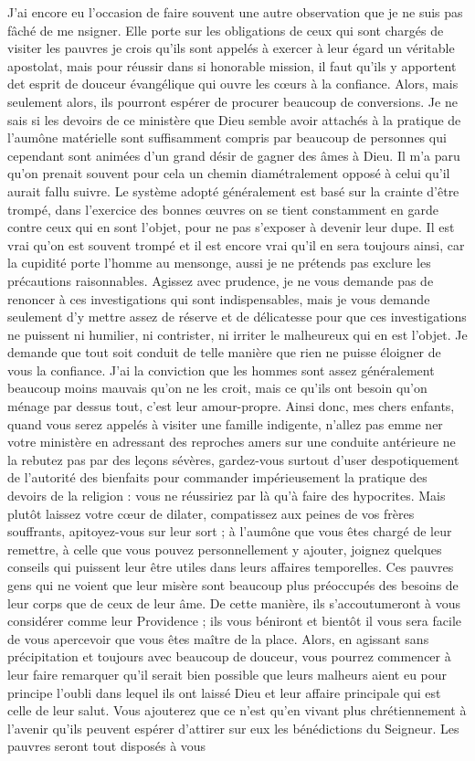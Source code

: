 \documentclass[11pt,a4paper]{report}
\begin{document}
J'ai encore eu l'occasion de faire souvent une autre observation que je ne suis pas fâché de me nsigner. Elle porte sur les obligations de ceux qui sont chargés de visiter les pauvres je crois qu'ils sont appelés à exercer à leur égard un véritable apostolat, mais pour réussir dans si honorable mission, il faut qu'ils y apportent det esprit de douceur évangélique qui ouvre les cœurs à la confiance. Alors, mais seulement alors, ils pourront espérer de procurer beaucoup de conversions. Je ne sais si les devoirs de ce ministère que Dieu semble avoir attachés à la pratique de l'aumône matérielle sont suffisamment compris par beaucoup de personnes qui cependant sont animées d'un grand désir de gagner des âmes à Dieu. Il m'a paru qu'on prenait souvent pour cela un chemin diamétralement opposé à celui qu'il aurait fallu suivre. Le système adopté généralement est basé sur la crainte d'être trompé, dans l'exercice des bonnes œuvres on se tient constamment en garde contre ceux qui en sont l'objet, pour ne pas s'exposer à devenir leur dupe. Il est vrai qu'on est souvent trompé et il est encore vrai qu'il en sera toujours ainsi, car la cupidité porte l'homme au mensonge, aussi je ne prétends pas exclure les précautions raisonnables. Agissez avec prudence, je ne vous demande pas de renoncer à ces investigations qui sont indispensables, mais je vous demande seulement d'y mettre assez de réserve et de délicatesse pour que ces investigations ne puissent ni humilier, ni contrister, ni irriter le malheureux qui en est l'objet. Je demande que tout soit conduit de telle manière que rien ne puisse éloigner de vous la confiance. J'ai la conviction que les hommes sont assez généralement beaucoup moins mauvais qu'on ne les croit, mais ce qu'ils ont besoin qu'on ménage par dessus tout, c'est leur amour-propre. Ainsi donc, mes chers enfants, quand vous serez appelés à visiter une famille indigente, n'allez pas emme ner votre ministère en adressant des reproches amers sur une conduite antérieure ne la rebutez pas par des leçons sévères, gardez-vous surtout d'user despotiquement de l'autorité des bienfaits pour commander impérieusement la pratique des devoirs de la religion : vous ne réussiriez par là qu'à faire des hypocrites. Mais plutôt laissez votre cœur de dilater, compatissez aux peines de vos frères souffrants, apitoyez-vous sur leur sort ; à l'aumône que vous êtes chargé de leur remettre, à celle que vous pouvez personnellement y ajouter, joignez quelques conseils qui puissent leur être utiles dans leurs affaires temporelles. Ces pauvres gens qui ne voient que leur misère sont beaucoup plus préoccupés des besoins de leur corps que de ceux de leur âme. De cette manière, ils s'accoutumeront à vous considérer comme leur Providence ; ils vous béniront et bientôt il vous sera facile de vous apercevoir que vous êtes maître de la place. Alors, en agissant sans précipitation et toujours avec beaucoup de douceur, vous pourrez commencer à leur faire remarquer qu'il serait bien possible que leurs malheurs aient eu pour principe l'oubli dans lequel ils ont laissé Dieu et leur affaire principale qui est celle de leur salut. Vous ajouterez que ce n'est qu'en vivant plus chrétiennement à l'avenir qu'ils peuvent espérer d'attirer sur eux les bénédictions du Seigneur. Les pauvres seront tout disposés à vous 
\end{document}
